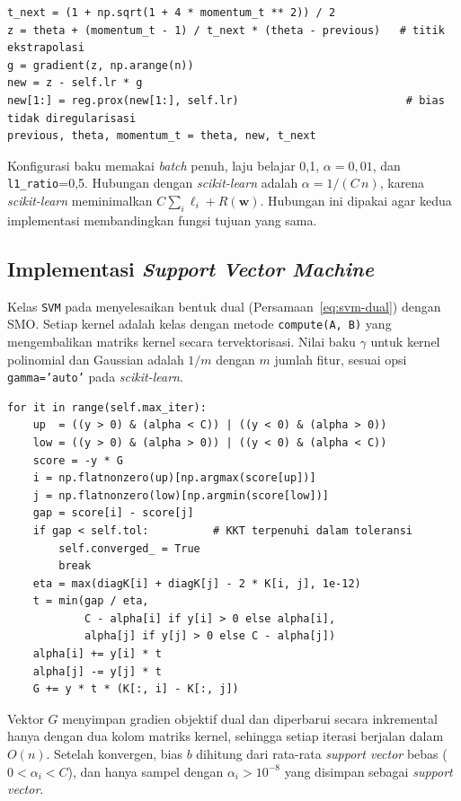 \begin{lstlisting}[caption={Satu iterasi FISTA (\texttt{src/logreg\_optim.py}, diringkas)},label={lst:fista}]
t_next = (1 + np.sqrt(1 + 4 * momentum_t ** 2)) / 2
z = theta + (momentum_t - 1) / t_next * (theta - previous)   # titik ekstrapolasi
g = gradient(z, np.arange(n))
new = z - self.lr * g
new[1:] = reg.prox(new[1:], self.lr)                          # bias tidak diregularisasi
previous, theta, momentum_t = theta, new, t_next
\end{lstlisting}

Konfigurasi baku memakai \textit{batch} penuh, laju belajar 0,1, $\alpha=0{,}01$, dan \texttt{l1\_ratio}=0,5. Hubungan dengan \textit{scikit-learn} adalah $\alpha=1/(C\,n)$, karena \textit{scikit-learn} meminimalkan $C\sum_i\ell_i+R(\mathbf{w})$. Hubungan ini dipakai agar kedua implementasi membandingkan fungsi tujuan yang sama.

\subsection{Implementasi \textit{Support Vector Machine}}
Kelas \texttt{SVM} pada  menyelesaikan bentuk dual (Persamaan~\ref{eq:svm-dual}) dengan SMO. Setiap kernel adalah kelas dengan metode \texttt{compute(A, B)} yang mengembalikan matriks kernel secara tervektorisasi. Nilai baku $\gamma$ untuk kernel polinomial dan Gaussian adalah $1/m$ dengan $m$ jumlah fitur, sesuai opsi \texttt{gamma='auto'} pada \textit{scikit-learn}.

\begin{lstlisting}[emph={_smo},caption={Iterasi SMO dengan pemilihan \textit{maximal violating pair} (\texttt{src/svm.py})},label={lst:smo}]
for it in range(self.max_iter):
    up  = ((y > 0) & (alpha < C)) | ((y < 0) & (alpha > 0))
    low = ((y > 0) & (alpha > 0)) | ((y < 0) & (alpha < C))
    score = -y * G
    i = np.flatnonzero(up)[np.argmax(score[up])]
    j = np.flatnonzero(low)[np.argmin(score[low])]
    gap = score[i] - score[j]
    if gap < self.tol:          # KKT terpenuhi dalam toleransi
        self.converged_ = True
        break
    eta = max(diagK[i] + diagK[j] - 2 * K[i, j], 1e-12)
    t = min(gap / eta,
            C - alpha[i] if y[i] > 0 else alpha[i],
            alpha[j] if y[j] > 0 else C - alpha[j])
    alpha[i] += y[i] * t
    alpha[j] -= y[j] * t
    G += y * t * (K[:, i] - K[:, j])
\end{lstlisting}

Vektor $G$ menyimpan gradien objektif dual dan diperbarui secara inkremental hanya dengan dua kolom matriks kernel, sehingga setiap iterasi berjalan dalam $O(n)$. Setelah konvergen, bias $b$ dihitung dari rata-rata \textit{support vector} bebas ($0<\alpha_i<C$), dan hanya sampel dengan $\alpha_i>10^{-8}$ yang disimpan sebagai \textit{support vector}.

